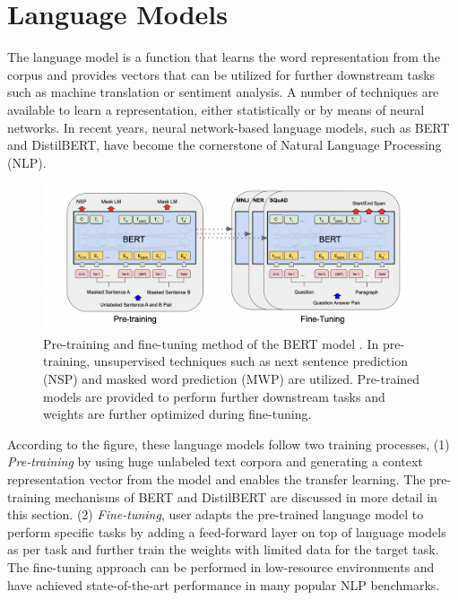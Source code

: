 \documentclass[%
	BCOR=8mm, %
	DIV=12,
	toc=bibliography, %
	toc=listof, %
	oneside, %
	egregdoesnotlikesansseriftitles, %
	]{scrbook}
\begin{document}
\section{Language Models}
\label{section:langaugemodels}
The language model is a function that learns the word representation from the corpus and provides vectors that can be utilized for further downstream tasks such as machine translation or sentiment analysis. A number of techniques are available to learn a representation, either statistically or by means of neural networks. In recent years, neural network-based language models, such as BERT and DistilBERT, have become the cornerstone of Natural Language Processing (NLP). 
\begin{figure}[H]
    \centering
    \includegraphics[width=0.7\linewidth]{img/pre_fintune.png}
    \caption[Diagram of pre-training and fine-tuning of BERT model]{ \small Pre-training and fine-tuning method of the BERT model \cite{devlin_bert_2019-1}. In pre-training, unsupervised techniques such as next sentence prediction (NSP) and masked word prediction (MWP) are utilized. Pre-trained models are provided to perform further downstream tasks and weights are further optimized during fine-tuning.}
    \label{fig:prefintune}
\end{figure}
According to the figure, these language models follow two training processes, (1)\textit{ Pre-training} by using huge unlabeled text corpora and generating a context representation vector from the model \cite{devlin_bert_2019-1}  and enables the transfer learning. The pre-training mechanisms of BERT and DistilBERT are discussed in more detail in this section. (2) \textit{Fine-tuning}, user adapts the pre-trained language model to perform specific tasks by adding a feed-forward layer on top of language models as per task and further train the weights with limited data for the target task. The fine-tuning approach can be performed in low-resource environments and have achieved state-of-the-art performance in many popular NLP benchmarks.
\end{document}
